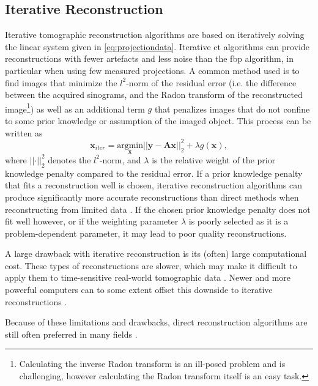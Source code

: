 \subsection{Iterative Reconstruction}
\label{sec:ct:reconstruction:iterative}
Iterative tomographic reconstruction algorithms are based on iteratively solving the linear system given in \cref{eq:projectiondata}. Iterative \gls{ct} algorithms can provide reconstructions with fewer artefacts and less noise than the \gls{fbp} algorithm, in particular when using few measured projections. A common method used is to find images that minimize the $l^2$-norm of the residual error (i.e. the difference between the acquired sinograms, and the Radon transform of the reconstructed image\footnote{Calculating the inverse Radon transform is an ill-posed problem and is challenging, however calculating the Radon transform itself is an easy task. }) as well as an additional term $g$ that penalizes images that do not confine to some prior knowledge or assumption of the imaged object. This process can be written as \cite{jimaging4110128}
\begin{equation}
    \label{eq:iterativesolution}
    \bm{x}_{iter} = \underset{\bm{x}}{\text{argmin}} \left|\left|\bm{y} - \bm{A}\bm{x}\right|\right|_2^2 + \lambda g(\bm{x}),
\end{equation}
where $\left|\left| \bm{\cdot} \right|\right|_2^2$ denotes the $l^2$-norm, and $\lambda$ is the relative weight of the prior knowledge penalty compared to the residual error. If a prior knowledge penalty that fits a reconstruction well is chosen, iterative reconstruction algorithms can produce significantly more accurate reconstructions than direct methods when reconstructing from limited data \cite{jimaging4110128}. If the chosen prior knowledge penalty does not fit well however, or if the weighting parameter $\lambda$ is poorly selected as it is a problem-dependent parameter, it may lead to poor quality reconstructions. 

A large drawback with iterative reconstruction is its (often) large computational cost. These types of reconstructions are slower, which may make it difficult to apply them to time-sensitive real-world tomographic data \cite{jimaging4110128}. Newer and more powerful computers can to some extent offset this downside to iterative reconstructions \cite{willemink2013iterative}. 

Because of these limitations and drawbacks, direct reconstruction algorithms are still often preferred in many fields \cite{Pan_2009}. 

